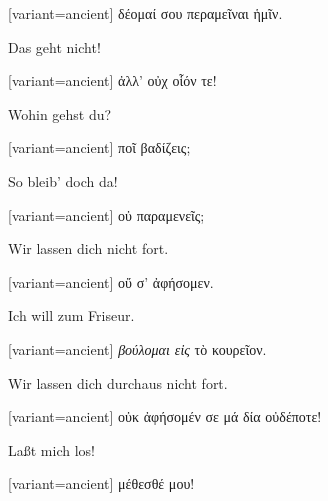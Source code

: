 \switchcolumn

\begin{greek}[variant=ancient]%
δέομαί σου περαμεῖναι ἡμῖν.

\end{greek}%
\switchcolumn*

Das geht nicht!

\switchcolumn

\begin{greek}[variant=ancient]%
ἀλλ' οὐχ οἷόν τε!

\end{greek}%
\switchcolumn*

Wohin gehst du?

\switchcolumn

\begin{greek}[variant=ancient]%
ποῖ βαδίζεις;

\end{greek}%
\switchcolumn*

So bleib' doch da!

\switchcolumn

\begin{greek}[variant=ancient]%
οὐ παραμενεῖς;

\end{greek}%
\switchcolumn*

Wir lassen dich nicht fort.

\switchcolumn

\begin{greek}[variant=ancient]%
οὔ σ' ἀφήσομεν.

\end{greek}%
\switchcolumn*

Ich will zum Friseur.

\switchcolumn

\begin{greek}[variant=ancient]%
\emph{βούλομαι εἰς} τὸ κουρεῖον.

\end{greek}%
\switchcolumn*

Wir lassen dich durchaus nicht fort.

\switchcolumn

\begin{greek}[variant=ancient]%
οὐκ ἀφήσομέν σε μά δία οὐδέποτε!

\end{greek}%
\switchcolumn*

Laßt mich los!

\switchcolumn

\begin{greek}[variant=ancient]%
μέθεσθέ μου!

\end{greek}%
\switchcolumn*

